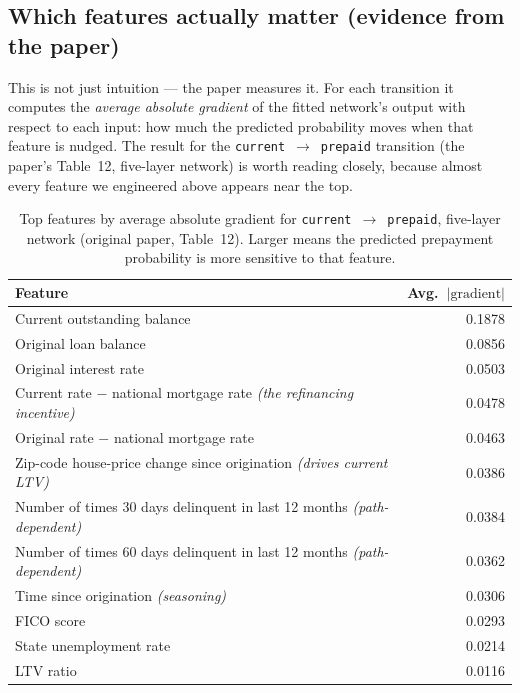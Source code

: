 \documentclass[11pt]{article}
\newcommand{\state}[1]{\texttt{#1}}
\begin{document}
\subsection{Which features actually matter (evidence from the paper)}

This is not just intuition --- the paper measures it. For each transition it computes the
\emph{average absolute gradient} of the fitted network's output with respect to each input:
how much the predicted probability moves when that feature is nudged. The result for the
\state{current}~$\to$~\state{prepaid} transition (the paper's Table~12, five-layer network) is
worth reading closely, because almost every feature we engineered above appears near the top.

\begin{table}[H]
\centering
\caption{Top features by average absolute gradient for \state{current}~$\to$~\state{prepaid},
five-layer network (original paper, Table~12). Larger means the predicted prepayment
probability is more sensitive to that feature.}
\vspace{2pt}
\small
\begin{tabular}{>{\raggedright\arraybackslash}p{9.2cm} r}
\toprule
\textbf{Feature} & \textbf{Avg.\ $|\text{gradient}|$} \\
\midrule
Current outstanding balance & 0.1878 \\
Original loan balance & 0.0856 \\
Original interest rate & 0.0503 \\
Current rate $-$ national mortgage rate \;\textit{(the refinancing incentive)} & 0.0478 \\
Original rate $-$ national mortgage rate & 0.0463 \\
Zip-code house-price change since origination \;\textit{(drives current LTV)} & 0.0386 \\
Number of times 30 days delinquent in last 12 months \;\textit{(path-dependent)} & 0.0384 \\
Number of times 60 days delinquent in last 12 months \;\textit{(path-dependent)} & 0.0362 \\
Time since origination \;\textit{(seasoning)} & 0.0306 \\
FICO score & 0.0293 \\
State unemployment rate & 0.0214 \\
LTV ratio & 0.0116 \\
\bottomrule
\end{tabular}
\end{table}
\end{document}
